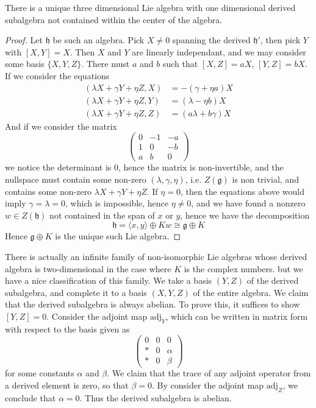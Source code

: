 \begin{theorem}
    There is a unique three dimensional Lie algebra with one dimensional derived subalgebra not contained within the center of the algebra.
\end{theorem}
\begin{proof}
    Let $\mathfrak{h}$ be such an algebra. Pick $X \neq 0$ spanning the derived $\mathfrak{h}'$, then pick $Y$ with $[X,Y] = X$. Then $X$ and $Y$ are linearly independant, and we may consider some basis $\{ X, Y, Z \}$. There must $a$ and $b$ such that $[X,Z] = aX$, $[Y,Z] = bX$. If we consider the equations
    \begin{align*}
        (\lambda X + \gamma Y + \eta Z, X) &= -(\gamma + \eta a) X\\
        (\lambda X + \gamma Y + \eta Z, Y) &= (\lambda - \eta b) X\\
        (\lambda X + \gamma Y + \eta Z, Z) &= (a \lambda + b \gamma) X
    \end{align*}
    And if we consider the matrix
    \[ \begin{pmatrix} 0 & -1 & -a \\ 1 & 0 & -b \\ a & b & 0 \end{pmatrix} \]
    we notice the determinant is $0$, hence the matrix is non-invertible, and the nullspace must contain some non-zero $(\lambda, \gamma, \eta)$, i.e. $Z(\mathfrak{g})$ is non trivial, and contains some non-zero $\lambda X + \gamma Y + \eta Z$. If $\eta = 0$, then the equations above would imply $\gamma = \lambda = 0$, which is impossible, hence $\eta \neq 0$, and we have found a nonzero $w \in Z(\mathfrak{h})$ not contained in the span of $x$ or $y$, hence we have the decomposition
    \[ \mathfrak{h} = \langle x, y \rangle \oplus Kw \cong \mathfrak{g} \oplus K \]
    Hence $\mathfrak{g} \oplus K$ is the unique such Lie algebra.
\end{proof}

There is actually an infinite family of non-isomorphic Lie algebras whose derived algebra is two-dimensional in the case where $K$ is the complex numbers. but we have a nice classification of this family. We take a basis $(Y,Z)$ of the derived subalgebra, and complete it to a basis $(X,Y,Z)$ of the entire algebra. We claim that the derived subalgebra is always abelian. To prove this, it suffices to show $[Y,Z] = 0$. Consider the adjoint map $\text{adj}_Y$, which can be written in matrix form with respect to the basis given as
%
\[ \begin{pmatrix} 0 & 0 & 0 \\ * & 0 & \alpha \\ * & 0 & \beta \end{pmatrix} \]
%
for some constants $\alpha$ and $\beta$. We claim that the trace of any adjoint operator from a derived element is zero, so that $\beta = 0$. By consider the adjoint map $\text{adj}_Z$, we conclude that $\alpha = 0$. Thus the derived subalgebra is abelian.

